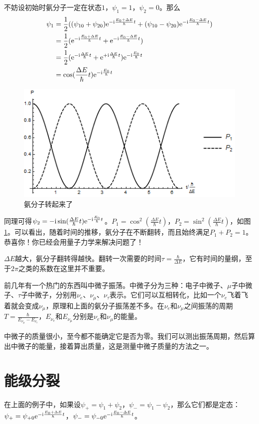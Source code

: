 不妨设初始时氨分子一定在状态$1$，$\psi_1=1$，$\psi_2=0$。那么
\begin{align*}
\psi_1&=\frac{1}{2}((\psi_{1 0}+\psi_{2 0}) \mathrm{e}^{-\mathrm{i} \frac{E_0+\Delta E}{\hbar} t}+(\psi_{1 0}-\psi_{2 0}) \mathrm{e}^{-\mathrm{i} \frac{E_0-\Delta E}{\hbar} t}) \\
&=\frac{1}{2}(\mathrm{e}^{-\mathrm{i} \frac{E_0+\Delta E}{\hbar} t}+\mathrm{e}^{-\mathrm{i} \frac{E_0-\Delta E}{\hbar} t}) \\
&=\frac{1}{2}(\mathrm{e}^{-\mathrm{i} \frac{\Delta E}{\hbar} t}+\mathrm{e}^{+\mathrm{i} \frac{\Delta E}{\hbar} t}) \mathrm{e}^{-\mathrm{i} \frac{E_0}{\hbar} t} \\
&=\cos (\frac{\Delta E}{\hbar} t) \mathrm{e}^{-\mathrm{i} \frac{E_0}{\hbar} t}
\end{align*}
\begin{figure}[htb]
\centering
\includegraphics[width=0.33\linewidth]{fig/ammonia-osc.png}
\caption{氨分子转起来了}
\label{fig-ammonia-osc}
\end{figure}

同理可得$\psi_2=-\mathrm{i} \sin (\frac{\Delta E}{\hbar} t) \mathrm{e}^{-\mathrm{i} \frac{E_0}{\hbar} t}$。$P_1=\cos^2 (\frac{\Delta E}{\hbar} t)$，$P_2=\sin^2 (\frac{\Delta E}{\hbar} t)$，如图\ref{fig-ammonia-osc}。可以看出，随着时间的推移，氨分子在不断翻转，而且始终满足$P_1+P_2=1$。恭喜你！你已经会用量子力学来解决问题了！

$\Delta E$越大，氨分子翻转得越快。翻转一次需要的时间$\tau=\frac{\hbar}{\Delta E}$，它有时间的量纲，至于$2 \pi$之类的系数在这里并不重要。

前几年有一个热门的东西叫中微子振荡。中微子分为三种：电子中微子、$\mu$子中微子、$\tau$子中微子，分别用$\nu_e$、$\nu_\mu$、$\nu_\tau$表示。它们可以互相转化，比如一个$\nu_e$飞着飞着就会变成$\nu_\mu$，原理和上面的氨分子振荡差不多。在$\nu_e$和$\nu_\mu$之间振荡的周期$T=\frac{\hbar}{E_{\nu_\mu}-E_{\nu_e}}$，$E_{\nu_e}$和$E_{\nu_\mu}$分别是$\nu_e$和$\nu_\mu$的能量。

中微子的质量很小，至今都不能确定它是否为零。我们可以测出振荡周期，然后算出中微子的能量，接着算出质量，这是测量中微子质量的方法之一。
\section{能级分裂}
在上面的例子中，如果设$\psi_+=\psi_1+\psi_2$，$\psi_-=\psi_1-\psi_2$，那么它们都是定态：$\psi_+=\psi_{+ 0} \mathrm{e}^{-\mathrm{i} \frac{E_0+\Delta E}{\hbar} t}$，$\psi_-=\psi_{- 0} \mathrm{e}^{-\mathrm{i} \frac{E_0-\Delta E}{\hbar} t}$。

